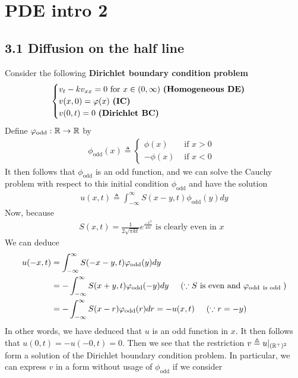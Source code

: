 \documentclass{report}
\begin{document}
\chapter{PDE intro 2}
\section{3.1 Diffusion on the half line}
\begin{mdframed}
  Consider the following \textbf{Dirichlet boundary condition problem}
\begin{align*}
\begin{cases}
  v_t-kv_{xx}=0 \text{ for }x\in (0,\infty)\text{ \textbf{(Homogeneous DE)} }\\
  v(x,0)=\phi (x)\text{ \textbf{(IC)} }\\
  v(0,t)=0\text{ \textbf{(Dirichlet BC)} }
\end{cases}
\end{align*}
Define $\phi_{\operatorname{odd}}:\R\rightarrow \R$ by 
\begin{align*}
\phi_{\operatorname{odd}}(x)\triangleq \begin{cases}
    \phi (x)& \text{ if $x>0$ }\\
    -\phi (x)& \text{ if $x<0$ }
  \end{cases}
\end{align*}
It then follows that $\phi_{\operatorname{odd}}$ is an odd function, and we can solve the Cauchy problem with respect to this initial condition $\phi_{\operatorname{odd}}$ and have the solution 
\begin{align*}
u(x,t)\triangleq \int_{-\infty}^{\infty} S(x-y,t)\phi_{\operatorname{odd}}(y)dy
\end{align*}
Now, because 
\begin{align*}
S(x,t)= \frac{1}{2\sqrt{\pi kt} }e^{\frac{-x^2}{4kt}}\text{ is clearly even in $x$ }
\end{align*}
We can deduce 
\begin{align*}
u(-x,t)&=\int_{-\infty}^{\infty}S(-x-y,t)\phi_{\operatorname{odd}}(y)dy \\
&=- \int_{-\infty}^{\infty}S(x+y,t)\phi_{\operatorname{odd}}(-y)dy \hspace{0.5cm}(\because S\text{ is even and }\phi_{\operatorname{odd}\text{ is odd }})\\
&=-\int_{-\infty}^{\infty}S(x-r)\phi_{\operatorname{odd}}(r)dr=-u(x,t)\hspace{0.5cm}(\because r=-y)
\end{align*}
In other words, we have deduced that $u$ is an odd function in $x$. It then follows that  $u(0,t)=-u(-0,t)=0$. Then we see that the restriction $v\triangleq u|_{(\R^+)^2}$ form a solution of the Dirichlet boundary condition problem. In particular, we can express $v$ in a form without usage of $\phi_{\operatorname{odd}}$ if we consider 

\end{mdframed}
\end{document}
